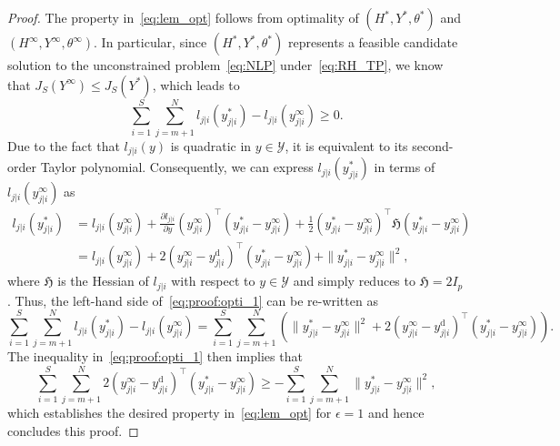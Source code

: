 \documentclass{article} %
\begin{document}
\begin{proof}
	The property in~\eqref{eq:lem_opt} follows from optimality of $(H^*,Y^*,\theta^*)$ and $(H^\infty,Y^\infty,\theta^\infty)$.
	In particular, since $(H^*,Y^*,\theta^*)$ represents a feasible candidate solution to the unconstrained problem~\eqref{eq:NLP} under~\eqref{eq:RH_TP}, we know that $J_S(Y^\infty)\leq J_S(Y^*)$,
	which leads to
	\begin{equation}\label{eq:proof:opti_1}
		\sum_{i=1}^{S}\sum_{j=m+1}^{N}l_{j|i}({y}_{j|i}^*)-l_{j|i}({y}^\infty_{j|i}) \geq 0.
	\end{equation}
	Due to the fact that $l_{j|i}(y)$ is quadratic in $y\in\mathcal{Y}$, it is equivalent to its second-order Taylor polynomial. Consequently, we can express $l_{j|i}(y^*_{j|i})$ in terms of $l_{j|i}(y^\infty_{j|i})$ as
	\begin{align*}
		l_{j|i}(y^*_{j|i}) %
		&= l_{j|i}(y^\infty_{j|i}) + \frac{\partial l_{j|i}}{\partial y}(y^\infty_{j|i})^\top(y^*_{j|i}-y^\infty_{j|i}) + \frac{1}{2}(y^*_{j|i}-y^\infty_{j|i})^\top \mathfrak{H}(y^*_{j|i}-y^\infty_{j|i})\\
		&= l_{j|i}(y^\infty_{j|i}) + 2(y^\infty_{j|i}-y_{j|i}^\mathrm{d})^\top(y^*_{j|i}-y^\infty_{j|i}) + \|y^*_{j|i}-y^\infty_{j|i}\|^2,
	\end{align*}
	where $\mathfrak{H}$ is the Hessian of $l_{j|i}$ with respect to $y\in\mathcal{Y}$ and simply reduces to $\mathfrak{H}=2I_p$.
	Thus, the left-hand side of~\eqref{eq:proof:opti_1} can be re-written as
	\begin{equation}
		\sum_{i=1}^{S}\sum_{j=m+1}^{N}l_{j|i}({y}_{j|i}^*)-l_{j|i}({y}^\infty_{j|i}) = \sum_{i=1}^{S}\sum_{j=m+1}^{N}\left(\|{y}_{j|i}^*-{y}_{j|i}^\infty\|^2 + 2(y^\infty_{j|i}-y_{j|i}^\mathrm{d})^\top({y}_{j|i}^*-{y}_{j|i}^\infty)\right).\label{eq:proof_l_difference}
	\end{equation}
	The inequality in~\eqref{eq:proof:opti_1} then implies that
	\begin{equation*}
		\sum_{i=1}^{S}\sum_{j=m+1}^{N}2(y^\infty_{j|i}-y_{j|i}^\mathrm{d})^\top({y}_{j|i}^*-{y}_{j|i}^\infty)
		\geq -\sum_{i=1}^{S}\sum_{j=m+1}^{N}\|{y}_{j|i}^*-{y}_{j|i}^\infty\|^2,
	\end{equation*}
	which establishes the desired property in~\eqref{eq:lem_opt} for $\epsilon=1$ and hence concludes this proof.
\end{proof}
\end{document}
